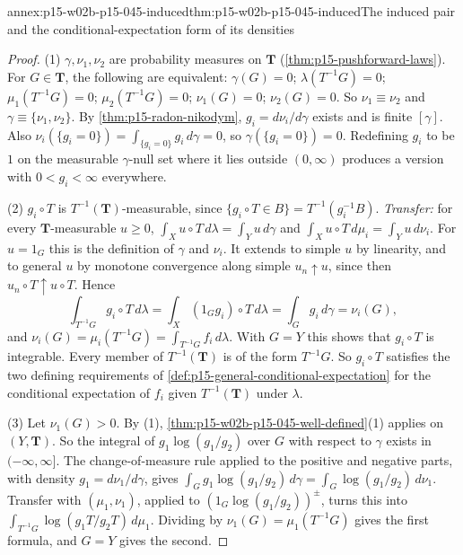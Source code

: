 \begin{annexitem}{annex:p15-w02b-p15-045-induced}{thm:p15-w02b-p15-045-induced}{The induced pair and the conditional-expectation form of its densities}
\begin{proof}
(1) \(\gamma,\nu_1,\nu_2\) are probability measures on \(\mathbf T\)
(\cref{thm:p15-pushforward-laws}). For \(G\in\mathbf T\), the following
are equivalent: \(\gamma(G)=0\); \(\lambda(T^{-1}G)=0\);
\(\mu_1(T^{-1}G)=0\); \(\mu_2(T^{-1}G)=0\); \(\nu_1(G)=0\); \(\nu_2(G)=0\).
So \(\nu_1\equiv\nu_2\) and \(\gamma\equiv\{\nu_1,\nu_2\}\). By
\cref{thm:p15-radon-nikodym}, \(g_i=d\nu_i/d\gamma\) exists and is finite
\([\gamma]\). Also
\(\nu_i(\{g_i=0\})=\int_{\{g_i=0\}}g_i\,d\gamma=0\), so
\(\gamma(\{g_i=0\})=0\). Redefining \(g_i\) to be \(1\) on the
measurable \(\gamma\)-null set where it lies outside \((0,\infty)\)
produces a version with \(0<g_i<\infty\) everywhere.

(2) \(g_i\circ T\) is \(T^{-1}(\mathbf T)\)-measurable, since
\(\{g_i\circ T\in B\}=T^{-1}(g_i^{-1}B)\). \emph{Transfer:} for every
\(\mathbf T\)-measurable \(u\geq0\),
\(\int_Xu\circ T\,d\lambda=\int_Yu\,d\gamma\) and
\(\int_Xu\circ T\,d\mu_i=\int_Yu\,d\nu_i\). For \(u=1_G\) this is the
definition of \(\gamma\) and \(\nu_i\). It extends to simple \(u\) by
linearity, and to general \(u\) by monotone convergence along simple
\(u_n\uparrow u\), since then \(u_n\circ T\uparrow u\circ T\). Hence
\[
  \int_{T^{-1}G}g_i\circ T\,d\lambda=\int_X(1_Gg_i)\circ T\,d\lambda
   =\int_Gg_i\,d\gamma=\nu_i(G),
\]
and \(\nu_i(G)=\mu_i(T^{-1}G)=\int_{T^{-1}G}f_i\,d\lambda\).
With \(G=Y\) this shows that \(g_i\circ T\) is integrable. Every
member of \(T^{-1}(\mathbf T)\) is of the form \(T^{-1}G\). So
\(g_i\circ T\) satisfies the two defining requirements of
\cref{def:p15-general-conditional-expectation} for the conditional
expectation of \(f_i\) given \(T^{-1}(\mathbf T)\) under \(\lambda\).

(3) Let \(\nu_1(G)>0\). By (1),
\cref{thm:p15-w02b-p15-045-well-defined}(1) applies on
\((Y,\mathbf T)\). So the integral of \(g_1\log(g_1/g_2)\) over \(G\)
with respect to \(\gamma\) exists in \((-\infty,\infty]\). The change-of-measure rule applied to the positive
and negative parts, with density \(g_1=d\nu_1/d\gamma\), gives
\(\int_Gg_1\log(g_1/g_2)\,d\gamma=\int_G\log(g_1/g_2)\,d\nu_1\). Transfer
with \((\mu_1,\nu_1)\), applied to \((1_G\log(g_1/g_2))^\pm\), turns this
into \(\int_{T^{-1}G}\log(g_1T/g_2T)\,d\mu_1\). Dividing by
\(\nu_1(G)=\mu_1(T^{-1}G)\) gives the first formula, and \(G=Y\) gives
the second.
\end{proof}
\end{annexitem}

